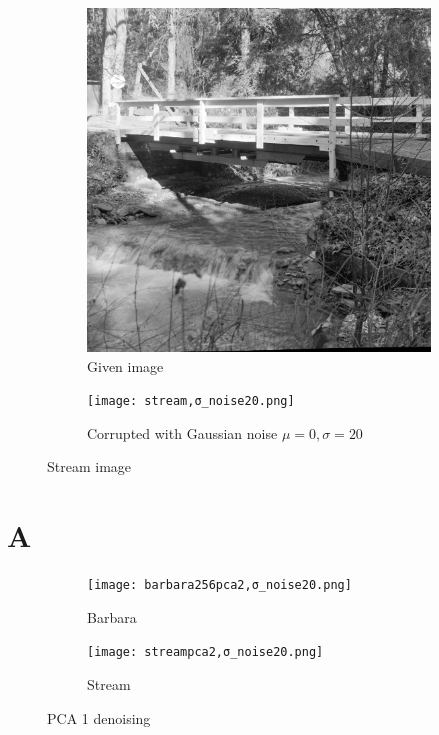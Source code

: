 \documentclass[a4paper, landscape]{article}
\begin{document}
\begin{figure}
    \centering
    \begin{subfigure}{0.48\linewidth}
        \centering
        \includegraphics[width=\linewidth]{stream.png}
        \caption{Given image}
    \end{subfigure}
    \begin{subfigure}{0.48\linewidth}
        \centering
        \texttt{[image: stream,σ\_noise20.png]}
        \caption{Corrupted with Gaussian noise $\mu=0, \sigma=20$}
    \end{subfigure}
    \caption{Stream image}
    \label{fig:ko}
\end{figure}
\section{A}
\begin{figure}
    \centering
    \begin{subfigure}{0.48\linewidth}
        \centering
        \texttt{[image: barbara256pca2,σ\_noise20.png]}
        \caption{Barbara}
    \end{subfigure}
    \begin{subfigure}{0.48\linewidth}
        \centering
        \texttt{[image: streampca2,σ\_noise20.png]}
        \caption{Stream}
    \end{subfigure}
    \caption{PCA 1 denoising}
    \label{fig:pca1}
\end{figure}
\end{document}
